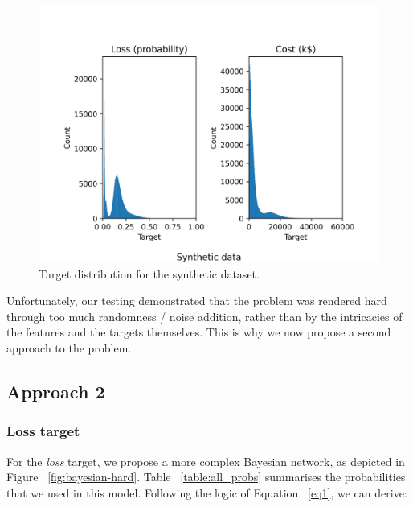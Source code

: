 \begin{figure}[h!]
	\center
	\includegraphics[scale=0.51]{images/synthetic/easy_distribution.png}
	\caption{\label{fig:distribution-easy} Target distribution for the synthetic dataset.}
\end{figure}

Unfortunately, our testing demonstrated that the problem was rendered hard through too much randomness / noise addition, rather than by the intricacies of the features and the targets themselves. This is why we now propose a second approach to the problem.

\subsection{Approach 2}

\subsubsection{Loss target}\label{subsubsection:prob_loss}

For the \textit{loss} target, we propose a more complex Bayesian network, as depicted in Figure ~\ref{fig:bayesian-hard}. Table ~\ref{table:all_probs} summarises the probabilities that we used in this model. Following the logic of Equation ~\ref{eq1}, we can derive:

